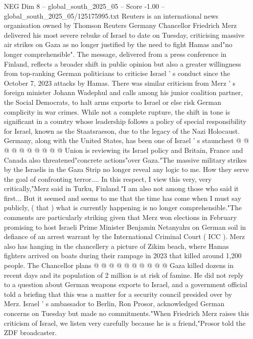 \begin{textsample}{NEG Dim 8 – global\_south\_2025\_05 – Score -1.00 – global\_south\_2025\_05/125175995.txt}  \label{ex:f8_neg_312}
Reuters is an international news organisation owned by Thomson Reuters Germany Chancellor Friedrich Merz delivered his most severe rebuke of Israel to date on Tuesday, criticising massive air strikes on Gaza as no longer justified by the need to fight Hamas and"no longer comprehensible".
The message, delivered from a press conference in Finland, reflects a broader shift in public opinion but also a greater willingness from top-ranking German politicians to criticise Israel ' s conduct since the October 7, 2023 attacks by Hamas.
There was similar criticism from Merz ' s foreign minister Johann Wadephul and calls among his junior coalition partner, the Social Democrats, to halt arms exports to Israel or else risk German complicity in war crimes.
While not a complete rupture, the shift in tone is significant in a country whose leadership follows a policy of special responsibility for Israel, known as the Staatsraeson, due to the legacy of the Nazi Holocaust.
Germany, along with the United States, has been one of Israel ' s staunchest @ @ @ @ @ @ @ @ @ @ Union is reviewing its Israel policy and Britain, France and Canada also threatened"concrete actions"over Gaza."The massive military strikes by the Israelis in the Gaza Strip no longer reveal any logic to me.
How they serve the goal of confronting terror....
In this respect, I view this very, very critically,"Merz said in Turku, Finland."I am also not among those who said it first...
But it seemed and seems to me that the time has come when I must say publicly, ( that ) what is currently happening is no longer comprehensible."The comments are particularly striking given that Merz won elections in February promising to host Israeli Prime Minister Benjamin Netanyahu on German soil in defiance of an arrest warrant by the International Criminal Court ( ICC ).
Merz also has hanging in the chancellery a picture of Zikim beach, where Hamas fighters arrived on boats during their rampage in 2023 that killed around 1,200 people.
The Chancellor plans @ @ @ @ @ @ @ @ @ @ Gaza killed dozens in recent days and its population of 2 million is at risk of famine.
He did not reply to a question about German weapons exports to Israel, and a government official told a briefing that this was a matter for a security council presided over by Merz.
Israel ' s ambassador to Berlin, Ron Prosor, acknowledged German concerns on Tuesday but made no commitments."When Friedrich Merz raises this criticism of Israel, we listen very carefully because he is a friend,"Prosor told the ZDF broadcaster.

\end{textsample}
